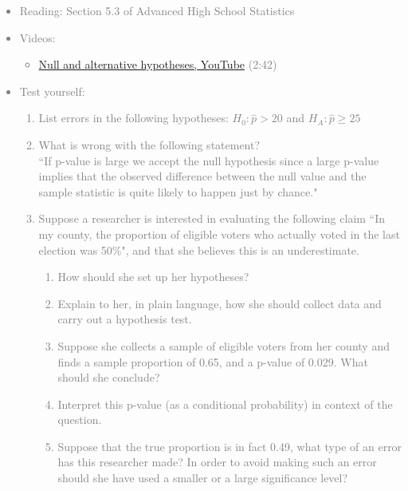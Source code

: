\documentclass[11pt]{article}
\newcommand{\gray}[1]{\textcolor{gray}{#1}}
\begin{document}
\gray{
{\it
\vspace{-0.5cm}
\begin{itemize}
\renewcommand{\labelitemi}{{\textcolor{dark}{$\ast$}}}
\item Reading: Section 5.3 of Advanced High School Statistics
\item Videos:
\begin{itemize}
\item \href{http://www.youtube.com/watch?v=5N7L1cGCL-w}{Null and alternative hypotheses, YouTube} (2:42)
\end{itemize}
\item Test yourself: 
{\small
\begin{enumerate}
\item List errors in the following hypotheses: $H_0: \hat{p} > 20$ and $H_A: \hat{p} \ge 25$
\item What is wrong with the following statement? \\
``If p-value is large we accept the null hypothesis since a large p-value implies that the observed difference between the null value and the sample statistic is quite likely to happen just by chance."
\item Suppose a researcher is interested in evaluating the following claim ``In my county, the proportion of eligible voters who actually voted in the last election was 50\%", and that she believes this is an underestimate.
\begin{enumerate}
\item How should she set up her hypotheses? 
\item Explain to her, in plain language, how she should collect data and carry out a hypothesis test.
\item Suppose she collects a sample of eligible voters from her county and finds a sample proportion of 0.65, and a p-value of 0.029. What should she conclude?
\item Interpret this p-value (as a conditional probability) in context of the question.
\item Suppose that the true proportion is in fact 0.49, what type of an error has this researcher made? In order to avoid making such an error should she have used a smaller or a large significance level?
\end{enumerate}
\end{enumerate}
}
\end{itemize}
}}
\end{document}
